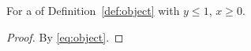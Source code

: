 
\begin{lemma}\label{lem:helper}
For a  of Definition~\ref{def:object} with $y \le 1$, $x \ge 0$.
\end{lemma}

\begin{proof}
By \eqref{eq:object}.
\end{proof}
